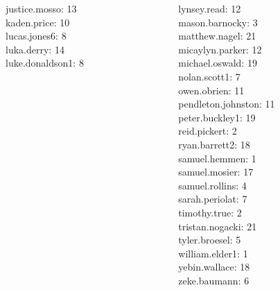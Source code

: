 \documentclass[10pt]{beamer}
\begin{document}
\begin{frame}
\begin{columns}
\begin{column}{0.33\textwidth}
justice.mosso: 13 \\ 
kaden.price: 10 \\ 
lucas.jones6: 8 \\ 
luka.derry: 14 \\ 
luke.donaldson1: 8 \\\end{column}
\begin{column}{0.33\textwidth}
lynsey.read: 12 \\ 
mason.barnocky: 3 \\ 
matthew.nagel: 21 \\ 
micaylyn.parker: 12 \\ 
michael.oswald: 19 \\ 
nolan.scott1: 7 \\ 
owen.obrien: 11 \\ 
pendleton.johnston: 11 \\ 
peter.buckley1: 19 \\ 
reid.pickert: 2 \\ 
ryan.barrett2: 18 \\ 
samuel.hemmen: 1 \\ 
samuel.mosier: 17 \\ 
samuel.rollins: 4 \\ 
sarah.periolat: 7 \\ 
timothy.true: 2 \\ 
tristan.nogacki: 21 \\ 
tyler.broesel: 5 \\ 
william.elder1: 1 \\ 
yebin.wallace: 18 \\ 
zeke.baumann: 6 \\\end{column}
\end{columns}
\vfill
\end{frame}
\end{document}
